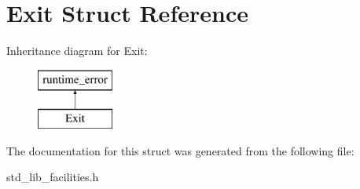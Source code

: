 \hypertarget{struct_exit}{\section{Exit Struct Reference}
\label{struct_exit}
}
Inheritance diagram for Exit\-:\begin{figure}[H]
\begin{center}
\leavevmode
\includegraphics[height=2.000000cm]{struct_exit}
\end{center}
\end{figure}


The documentation for this struct was generated from the following file\-:\begin{DoxyCompactItemize}
\item 
std\-\_\-lib\-\_\-facilities.\-h\end{DoxyCompactItemize}
